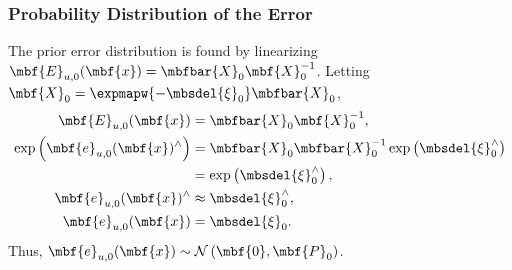 \subsubsection{Probability Distribution of the Error}

The prior error distribution is found by linearizing $\mbf{E}_{u,0}(\mbf{x}) = \mbfbar{X}_0\mbf{X}_0^{-1}$. Letting $\mbf{X}_0 = \expmapw{-\mbsdel{\xi}_0}\mbfbar{X}_0$,
\begin{align*}
	\mbf{E}_{u,0}(\mbf{x}) &=  \mbfbar{X}_0\mbf{X}_0^{-1}, \\
	\exp\left(\mbf{e}_{u,0}(\mbf{x})^\wedge\right) &= \mbfbar{X}_0\mbfbar{X}_0^{-1}\exp\left(\mbsdel{\xi}_0^\wedge\right) \\
	&= \exp\left(\mbsdel{\xi}_0^\wedge\right), \\
	\mbf{e}_{u,0}(\mbf{x})^\wedge &\approx \mbsdel{\xi}_0^\wedge, \\
	\mbf{e}_{u,0}(\mbf{x}) &= \mbsdel{\xi}_0.
\end{align*}
Thus, $\mbf{e}_{u,0}(\mbf{x}) \sim \mathcal{N}\left(\mbf{0},\mbf{P}_0\right)$.


